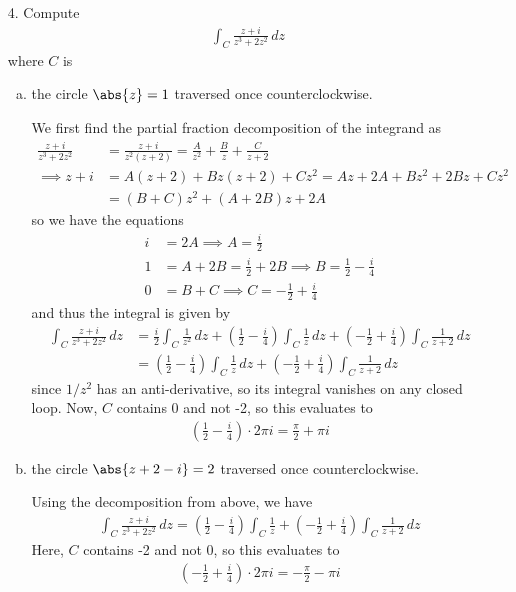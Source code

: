 \documentclass{article}
\begin{document}
\begin{itemize}
	\item[4.] Compute
		\begin{align*}
			\int_C \frac{z+i}{z^3+2z^2}\, dz
		\end{align*}
		where $C$ is
		\begin{enumerate}[(a)]
			\item the circle $\abs{z}=1$ traversed once counterclockwise.
				\begin{soln}
					We first find the partial fraction decomposition of the integrand as
					\begin{align*}
						\frac{z+i}{z^3+2z^2} &= \frac{z+i}{z^2(z+2)} = \frac{A}{z^2}+\frac{B}{z} + \frac{C}{z+2} \\
						\implies z+i &= A(z+2) + Bz(z+2) + Cz^2 = Az + 2A + Bz^2 + 2Bz + Cz^2 \\
						&= (B+C)z^2 + (A+2B)z + 2A 
					\end{align*}
					so we have the equations
					\begin{align*}
						i &= 2A \implies A = \frac{i}{2} \\
						1 &= A+2B = \frac{i}{2} + 2B \implies B = \frac{1}{2} - \frac{i}{4} \\
						0 &= B+C \implies C = -\frac{1}{2} + \frac{i}{4}
					\end{align*}
					and thus the integral is given by
					\begin{align*}
						\int_C \frac{z+i}{z^3+2z^2}\, dz &= \frac{i}{2}\int_C\frac{1}{z^2}\, dz + \left( \frac{1}{2} - \frac{i}{4} \right)\int_C \frac{1}{z} \, dz + \left( -\frac{1}{2} + \frac{i}{4} \right)\int_C \frac{1}{z+2}\, dz \\
						&= \left( \frac{1}{2}-\frac{i}{4} \right)\int_C \frac{1}{z}\, dz + \left( -\frac{1}{2} + \frac{i}{4} \right)\int_C \frac{1}{z+2}\, dz
					\end{align*}
					since $1/z^2$ has an anti-derivative, so its integral vanishes on any closed loop. Now, $C$ contains 0 and not -2, so this evaluates to
					\begin{align*}
						\left( \frac{1}{2}-\frac{i}{4} \right)\cdot 2\pi i = \frac{\pi}{2} + \pi i
					\end{align*}
				\end{soln}

			\item the circle $\abs{z+2-i}=2$ traversed once counterclockwise.
				\begin{soln}
					Using the decomposition from above, we have
					\begin{align*}
						\int_C \frac{z+i}{z^3+2z^2}\, dz = \left( \frac{1}{2} - \frac{i}{4} \right)\int_C \frac{1}{z} + \left( -\frac{1}{2} + \frac{i}{4} \right)\int_C \frac{1}{z+2}\, dz
					\end{align*}
					Here, $C$ contains -2 and not 0, so this evaluates to 
					\begin{align*}
						\left( -\frac{1}{2} + \frac{i}{4} \right)\cdot 2\pi i = -\frac{\pi}{2} - \pi i
					\end{align*}
				\end{soln}


\end{enumerate}
\end{itemize}
\end{document}
